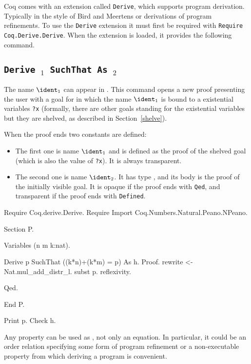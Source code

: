 

Coq comes with an extension called {\tt Derive}, which supports
program derivation. Typically in the style of Bird and Meertens or
derivations of program refinements. To use the {\tt Derive} extension
it must first be required with {\tt Require Coq.Derive.Derive}. When
the extension is loaded, it provides the following command.

\subsection[\tt Derive \ident$_1$ SuchThat \term{} As \ident$_2$]
       {\tt Derive \ident$_1$ SuchThat \term{} As \ident$_2$}

The name $\ident_1$ can appear in \term. This command opens a new
proof presenting the user with a goal for \term{} in which the name
$\ident_1$ is bound to a existential variables {\tt ?x} (formally,
there are other goals standing for the existential variables but they
are shelved, as described in Section~\ref{shelve}).

When the proof ends two constants are defined:
\begin{itemize}
\item The first one is name $\ident_1$ and is defined as the proof of
  the shelved goal (which is also the value of {\tt ?x}). It is
always transparent.
\item The second one is name $\ident_2$. It has type {\tt \term}, and
  its body is the proof of the initially visible goal. It is opaque if
  the proof ends with {\tt Qed}, and transparent if the proof ends
  with {\tt Defined}.
\end{itemize}

\Example
\begin{coq_example*}
Require Coq.derive.Derive.
Require Import Coq.Numbers.Natural.Peano.NPeano.

Section P.

Variables (n m k:nat).

\end{coq_example*}
\begin{coq_example}
Derive p SuchThat ((k*n)+(k*m) = p) As h.
Proof.
rewrite <- Nat.mul_add_distr_l.
subst p.
reflexivity.
\end{coq_example}
\begin{coq_example*}
Qed.

End P.

\end{coq_example*}
\begin{coq_example}
Print p.
Check h.
\end{coq_example}

Any property can be used as \term, not only an equation. In
particular, it could be an order relation specifying some form of
program refinement or a non-executable property from which deriving a
program is convenient.
